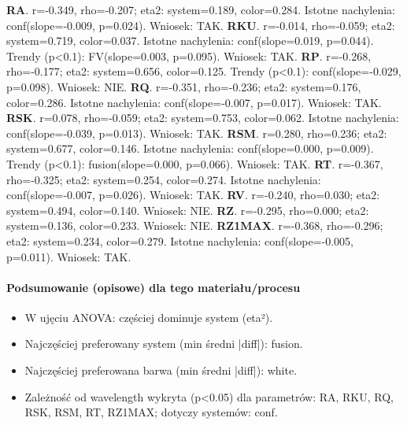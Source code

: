 \documentclass[
  10pt,
]{article}
\begin{document}
\textbf{RA}. r=-0.349, rho=-0.207; eta2: system=0.189, color=0.284.
Istotne nachylenia: conf(slope=-0.009, p=0.024). Wniosek: TAK.
\textbf{RKU}. r=-0.014, rho=-0.059; eta2: system=0.719, color=0.037.
Istotne nachylenia: conf(slope=0.019, p=0.044). Trendy (p\textless0.1):
FV(slope=0.003, p=0.095). Wniosek: TAK. \textbf{RP}. r=-0.268,
rho=-0.177; eta2: system=0.656, color=0.125. Trendy (p\textless0.1):
conf(slope=-0.029, p=0.098). Wniosek: NIE. \textbf{RQ}. r=-0.351,
rho=-0.236; eta2: system=0.176, color=0.286. Istotne nachylenia:
conf(slope=-0.007, p=0.017). Wniosek: TAK. \textbf{RSK}. r=0.078,
rho=-0.059; eta2: system=0.753, color=0.062. Istotne nachylenia:
conf(slope=-0.039, p=0.013). Wniosek: TAK. \textbf{RSM}. r=0.280,
rho=0.236; eta2: system=0.677, color=0.146. Istotne nachylenia:
conf(slope=0.000, p=0.009). Trendy (p\textless0.1): fusion(slope=0.000,
p=0.066). Wniosek: TAK. \textbf{RT}. r=-0.367, rho=-0.325; eta2:
system=0.254, color=0.274. Istotne nachylenia: conf(slope=-0.007,
p=0.026). Wniosek: TAK. \textbf{RV}. r=-0.240, rho=0.030; eta2:
system=0.494, color=0.140. Wniosek: NIE. \textbf{RZ}. r=-0.295,
rho=0.000; eta2: system=0.136, color=0.233. Wniosek: NIE.
\textbf{RZ1MAX}. r=-0.368, rho=-0.296; eta2: system=0.234, color=0.279.
Istotne nachylenia: conf(slope=-0.005, p=0.011). Wniosek: TAK.

\paragraph{Podsumowanie (opisowe) dla tego materiału/procesu}
\begin{itemize}
\item W ujęciu ANOVA: częściej dominuje system (eta²).
\item Najczęściej preferowany system (min średni |diff|): fusion.
\item Najczęściej preferowana barwa (min średni |diff|): white.
\item Zależność od wavelength wykryta (p<0.05) dla parametrów: RA, RKU, RQ, RSK, RSM, RT, RZ1MAX; dotyczy systemów: conf.
\end{itemize}
\end{document}
